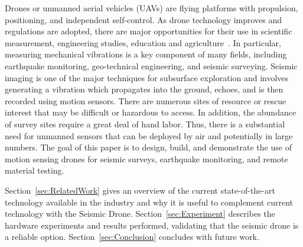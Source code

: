 Drones or unmanned aerial vehicles (UAVs) are flying
platforms with propulsion, positioning, and independent self-control.
As drone technology improves and regulations are
adopted, there are major opportunities for their use in scientific measurement, engineering studies, education and agriculture~\cite{tripicchio2015towards}. In particular,
measuring mechanical vibrations is a key component of many
fields, including earthquake monitoring, geo-technical engineering,
and seismic surveying. Seismic imaging is one of the
major techniques for subsurface exploration
and involves generating a vibration which propagates
into the ground, echoes, and is then recorded using motion
sensors. There are numerous sites of resource or rescue interest
that may be difficult or hazardous to access. In addition, the abundance of survey sites require a great deal
of hand labor. Thus, there is a substantial need for unmanned
sensors that can be deployed by air and potentially in large
numbers. 
The goal of this paper is to design, build, and demonstrate
the use of motion sensing drones for seismic surveys, earthquake monitoring, and remote material testing. 

Section~\ref{sec:RelatedWork}  gives an overview of  the current state-of-the-art technology available in the industry and why it is useful to complement current technology  with the Seismic Drone.
Section~\ref{sec:Experiment} describes the hardware experiments and results performed, validating that the seismic drone is a reliable option. Section~\ref{sec:Conclusion} concludes with future work.

